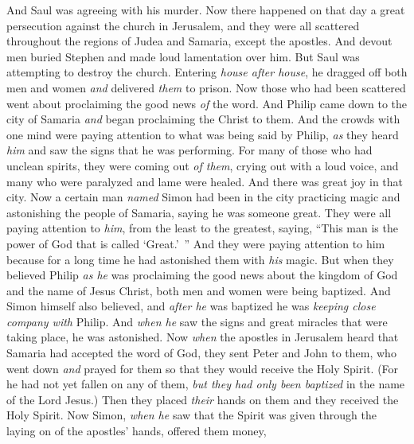 \begin{biblechapter} %
 And Saul was agreeing with his murder. Now there happened on that day a great persecution against the church in Jerusalem, and they were all scattered throughout the regions of Judea and Samaria, except the apostles.
\verse And devout men buried Stephen and made loud lamentation over him.
\verse But Saul was attempting to destroy the church. Entering \textit{house after house}, he dragged off both men and women \textit{and} delivered \textit{them} to prison.
 Now those who had been scattered went about proclaiming the good news \textit{of} the word.
\verse And Philip came down to the city of Samaria \textit{and} began proclaiming the Christ to them.
\verse And the crowds with one mind were paying attention to what was being said by Philip, \textit{as} they heard \textit{him} and saw the signs that he was performing.
\verse For many of those who had unclean spirits, they were coming out \textit{of them}, crying out with a loud voice, and many who were paralyzed and lame were healed.
\verse And there was great joy in that city.
 Now a certain man \textit{named} Simon had been in the city practicing magic and astonishing the people of Samaria, saying he was someone great.
\verse They were all paying attention to \textit{him}, from the least to the greatest, saying, “This man is the power of God that is called ‘Great.’ ”
\verse And they were paying attention to him because for a long time he had astonished them with \textit{his} magic.
\verse But when they believed Philip \textit{as he} was proclaiming the good news about the kingdom of God and the name of Jesus Christ, both men and women were being baptized.
\verse And Simon himself also believed, and \textit{after he} was baptized he was \textit{keeping close company with} Philip. And \textit{when he} saw the signs and great miracles that were taking place, he was astonished.
\verse Now \textit{when} the apostles in Jerusalem heard that Samaria had accepted the word of God, they sent Peter and John to them,
\verse who went down \textit{and} prayed for them so that they would receive the Holy Spirit.
\verse (For he had not yet fallen on any of them, \textit{but they had only been baptized} in the name of the Lord Jesus.)
\verse Then they placed \textit{their} hands on them and they received the Holy Spirit.
\verse Now Simon, \textit{when he} saw that the Spirit was given through the laying on of the apostles’ hands, offered them money,

\end{biblechapter}
